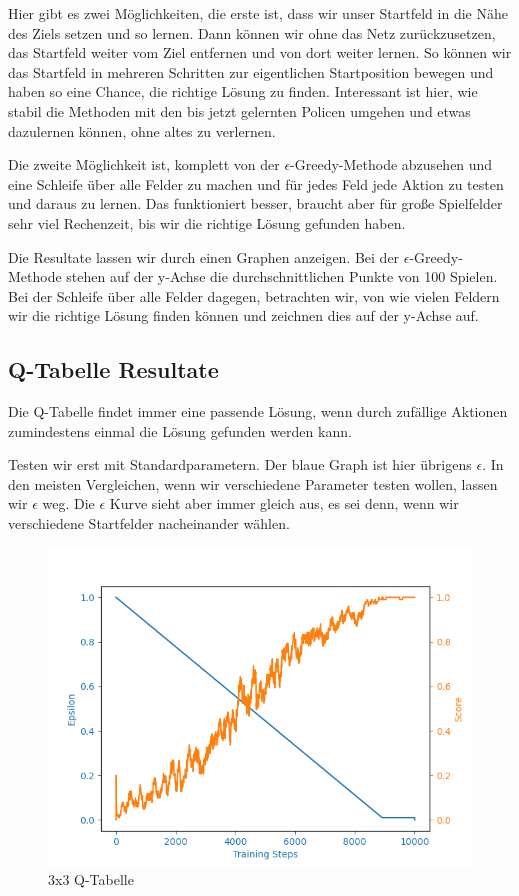 Hier gibt es zwei Möglichkeiten, die erste ist, dass wir unser Startfeld in die Nähe des Ziels setzen und so lernen. Dann können wir ohne das Netz zurückzusetzen, das Startfeld weiter vom Ziel entfernen und von dort weiter lernen. So können wir das Startfeld in mehreren Schritten zur eigentlichen Startposition bewegen und haben so eine Chance, die richtige Lösung zu finden. Interessant ist hier, wie stabil die Methoden mit den bis jetzt gelernten Policen umgehen und etwas dazulernen können, ohne altes zu verlernen. 

Die zweite Möglichkeit ist, komplett von der $\epsilon$-Greedy-Methode abzusehen und eine Schleife über alle Felder zu machen und für jedes Feld jede Aktion zu testen und daraus zu lernen. Das funktioniert besser, braucht aber für große Spielfelder sehr viel Rechenzeit, bis wir die richtige Lösung gefunden haben.

Die Resultate lassen wir durch einen Graphen anzeigen. Bei der $\epsilon$-Greedy-Methode stehen auf der y-Achse die durchschnittlichen Punkte von 100 Spielen. Bei der Schleife über alle Felder dagegen, betrachten wir, von wie vielen Feldern wir die richtige Lösung finden können und zeichnen dies auf der y-Achse auf.

\subsection{Q-Tabelle Resultate}
\label{subsec:Q-Tabelle_r}

Die Q-Tabelle findet immer eine passende Lösung, wenn durch zufällige Aktionen zumindestens einmal die Lösung gefunden werden kann.

Testen wir erst mit Standardparametern.
Der blaue Graph ist hier übrigens  $\epsilon$. In den meisten Vergleichen, wenn wir verschiedene Parameter testen wollen, lassen wir  $\epsilon$ weg. Die  $\epsilon$ Kurve sieht aber immer gleich aus, es sei denn, wenn wir verschiedene Startfelder nacheinander wählen.

\begin{figure}[H]
\centering
\includegraphics[width=\textwidth]{Figures/q_table_3x3.png}
\caption{3x3 Q-Tabelle}
\label{q1}
\end{figure}

